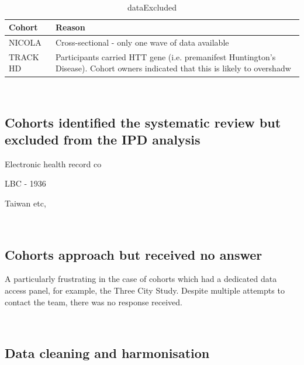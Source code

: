 \documentclass[a4paper, twoside]{templates/ociamthesis}
\begin{document}
~





\begin{table}[H]

\caption[dataExcluded]{\label{tab:dataExcluded-table}dataExcluded}
\centering
\begin{tabular}[t]{ll}
\toprule
\textbf{Cohort} & \textbf{Reason}\\
\midrule
NICOLA & Cross-sectional - only one wave of data available\\
TRACK HD & Participants carried HTT gene (i.e. premanifest Huntington's Disease). Cohort owners indicated that this is likely to overshadw\\
\bottomrule
\end{tabular}
\end{table}

~

\hypertarget{cohorts-identified-the-systematic-review-but-excluded-from-the-ipd-analysis}{%
\subsection{Cohorts identified the systematic review but excluded from the IPD analysis}\label{cohorts-identified-the-systematic-review-but-excluded-from-the-ipd-analysis}}

Electronic health record co

LBC - 1936

Taiwan etc,

~

\hypertarget{cohorts-approach-but-received-no-answer}{%
\subsection{Cohorts approach but received no answer}\label{cohorts-approach-but-received-no-answer}}

A particularly frustrating in the case of cohorts which had a dedicated data access panel, for example, the Three City Study. Despite multiple attempts to contact the team, there was no response received.

~

\hypertarget{data-cleaning-and-harmonisation}{%
\subsection{Data cleaning and harmonisation}\label{data-cleaning-and-harmonisation}}
\end{document}
